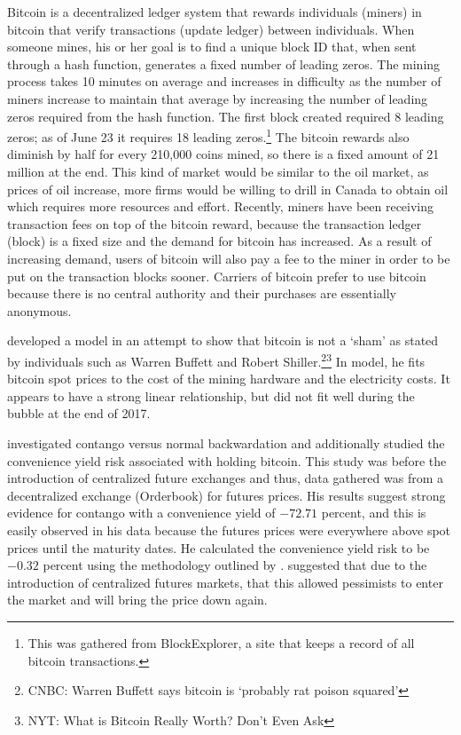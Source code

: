 \documentclass{paper}
\begin{document}
\begin{doublespacing}
Bitcoin is a decentralized ledger system that rewards individuals (miners) in bitcoin that verify transactions (update ledger) between individuals. When someone mines, his or her goal is to find a unique block ID that, when sent through a hash function, generates a fixed number of leading zeros. The mining process takes 10 minutes on average and increases in difficulty as the number of miners increase to maintain that average by increasing the number of leading zeros required from the hash function. The first block created required 8 leading zeros; as of June 23 it requires 18 leading zeros.\footnote{This was gathered from BlockExplorer, a site that keeps a record of all bitcoin transactions.} The bitcoin rewards also diminish by half for every 210,000 coins mined, so there is a fixed amount of 21 million at the end. This kind of market would be similar to the oil market, as prices of oil increase, more firms would be willing to drill in Canada to obtain oil which requires more resources and effort. Recently,  miners have been receiving transaction fees on top of the bitcoin reward, because the transaction ledger (block) is a fixed size and the demand for bitcoin has increased. As a result of increasing demand, users of bitcoin will also pay a fee to the miner in order to be put on the transaction blocks sooner. Carriers of bitcoin prefer to use bitcoin because there is no central authority and their purchases are essentially anonymous.

\cite{hayes2018} developed a model in an attempt to show that bitcoin is not a `sham' as stated by individuals such as Warren Buffett and Robert Shiller.\footnote{CNBC: Warren Buffett says bitcoin is `probably rat poison squared'}\footnote{NYT: What is Bitcoin Really Worth? Don't Even Ask} In \citeauthor{hayes2018} model, he fits bitcoin spot prices to the cost of the mining hardware and the electricity costs. It appears to have a strong linear relationship, but did not fit well during the bubble at the end of 2017.

\cite{ozvatic2015} investigated contango versus normal backwardation and additionally studied the convenience yield risk associated with holding bitcoin. This study was before the introduction of centralized future exchanges and thus, data gathered was from a decentralized exchange (Orderbook) for futures prices. His results suggest strong evidence for contango with a convenience yield of $-72.71$ percent, and this is easily observed in his data because the futures prices were everywhere above spot prices until the maturity dates. He calculated the convenience yield risk to be $-0.32$ percent using the methodology outlined by \cite{gibsschw1990}. \cite{haleetal2018} suggested that due to the introduction of centralized futures markets, that this allowed pessimists to enter the market and will bring the price down again.


\end{doublespacing}
\end{document}
